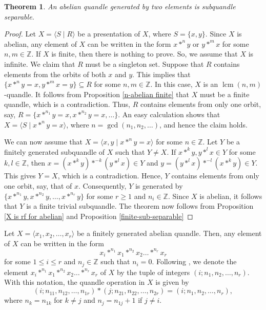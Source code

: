 \documentclass[12pt]{amsart}
\newtheorem{theorem}{Theorem}[section]
\theoremstyle{definition}
\numberwithin{equation}{subsection}
\newcommand{\lcm}{\operatorname{lcm}}
\begin{document}
\begin{theorem}\label{two generated abelian quandle}
An abelian quandle generated by two elements is subquandle separable.
\end{theorem}
\begin{proof}
Let $X=\langle S\mid R\rangle$ be a presentation of $X$, where $S=\{x,y\}$.  Since $X$ is abelian, any element of $X$ can be written in the form $x*^ny$ or $y*^mx$ for some $n, m \in \mathbb{Z}$. If $X$ is finite, then there is nothing to prove. So, we assume that $X$ is infinite. We claim that $R$ must be a singleton set. Suppose that $R$ contains elements from the orbits of both $x$ and $y$. This implies that $\{x*^{n}y=x,y*^mx=y\}\subseteq R$ for some $n, m \in \mathbb{Z}$. In this case, $X$ is an $\lcm(n,m)$-quandle. It follows from Proposition \ref{n-abelian finite} that $X$ must be a finite quandle, which is a contradiction. Thus,  $R$ contains elements from only one orbit, say, $R=\{x*^{n_1}y=x, x*^{n_2}y=x, \ldots\}$. An easy calculation shows that $X=\langle S\mid x*^ny=x\rangle$, where $n=\gcd(n_1,n_2,\ldots)$, and hence the claim holds. 
\par
We can now assume that $X=\langle x,y\mid x*^n y=x\rangle$ for some $n\in\mathbb{Z}$. Let $Y$ be a finitely generated subquandle of $X$ such that $Y \ne X$. If $x*^k y,y*^l x \in Y$ for some $k, l \in \mathbb{Z}$, then $x=(x*^ky)*^{-k}(y*^lx)\in Y$ and $y=(y*^lx)*^{-l}(x*^ky)\in Y$. This gives $Y=X$, which is a contradiction. Hence, $Y$ contains elements from only one orbit,  say, that of $x$. Consequently, $Y$ is generated by $\{x*^{n_1}y, x*^{n_2}y, \dots,x*^{n_r}y\}$ for some $r \ge 1$ and $n_i \in \mathbb{Z}$. Since $X$ is abelian, it follows that $Y$ is a finite trivial subquandle. The theorem now follows from Proposition \ref{X is rf for abelian} and  Proposition \ref{finite-sub-separable}
\end{proof}

Let $X=\langle x_1, x_2,\dots,x_r\rangle$ be a finitely generated abelian quandle. Then, any element of $X$ can be written in the form 
$$x_i*^{n_1}x_1*^{n_2}x_2\dots*^{n_r}x_r$$
for some $1 \le i \le r$ and $n_j \in \mathbb{Z}$ such that $n_i=0$.  Following  \cite{MR0781361}, we denote the element $x_i*^{n_1}x_1*^{n_2}x_2\dots*^{n_r}x_r$ of $X$ by the tuple of integers $(i;n_1,n_2,\dots,n_r)$. With this notation, the quandle operation in $X$ is given by
	\begin{equation}\label{operation of abelian quandle}
	 (i;n_{11},n_{12},\dots,n_{1r})*(j;n_{21},n_{22},\dots,n_{2r})=(i;n_1,n_2,\dots,n_r),	
	\end{equation}
  where $n_k=n_{1k}$ for $k\neq j$ and $n_j=n_{1j}+1$ if $j\neq i$.
\end{document}
